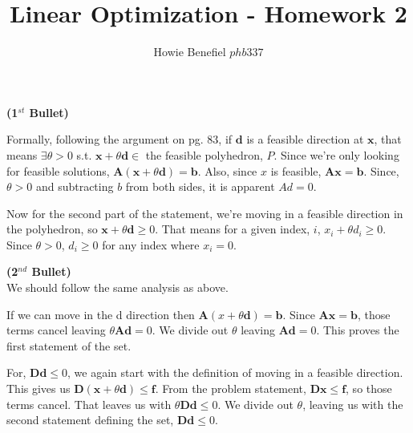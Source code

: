 \documentclass[12pt]{article}
\newcommand{\matr}[1]{\mathbf{#1}}
\newenvironment{problem}[2][Problem]{\begin{trivlist}
\item[\hskip \labelsep {\bfseries #1}\hskip \labelsep {\bfseries #2.}]}{\end{trivlist}}
\newenvironment{subproblem}[1]{\textbf{(#1)}}{}
\theoremstyle{definition}
\begin{document}

\title{Linear Optimization - Homework 2}
\author{Howie Benefiel \(phb337\)}
\maketitle

\begin{problem}{1}
\begin{subproblem}{1$^{st}$ Bullet}
$ $ \newline

Formally, following the argument on pg. 83,
if $\matr{d}$ is a feasible direction at $\matr{x}$, that means $\exists  \theta > 0$ s.t. $\matr{x} + \theta \matr{d} \in$ the feasible polyhedron, $P$.
Since we're only looking for feasible solutions, $\matr{A}(\matr{x} + \theta \matr{d})=\matr{b}$.
Also, since $x$ is feasible, $\matr{A}\matr{x} = \matr{b}$.
Since, $\theta > 0$ and subtracting $b$ from both sides, it is apparent $Ad=0$.

Now for the second part of the statement, we're moving in a feasible direction in the polyhedron,
so $\matr{x}+\theta \matr{d} \geq 0$.
That means for a given index, $i$, $x_i+\theta d_i \geq 0$.
Since $\theta > 0$, $d_i \geq 0$ for any index where $x_i=0$. \\
\end{subproblem}

\begin{subproblem}{2$^{nd}$ Bullet}
$ $ \\
We should follow the same analysis as above.

If we can move in the d direction then $\matr{A}(x + \theta \matr{d}) = \matr{b}$.
Since $\matr{A}\matr{x}=\matr{b}$, those terms cancel leaving $\theta \matr{A} \matr{d} = 0$.
We divide out $\theta$ leaving $\matr{A}\matr{d}=0$.
This proves the first statement of the set.

For, $\matr{D}\matr{d} \leq 0$, we again start with the definition of moving in a feasible direction.
This gives us $\matr{D}(\matr{x}+\theta\matr{d}) \leq \matr{f}$.
From the problem statement, $\matr{D}\matr{x} \leq \matr{f}$, so those terms cancel.
That leaves us with $\theta\matr{D}\matr{d} \leq 0$.
We divide out $\theta$, leaving us with the second statement defining the set, $\matr{D}\matr{d} \leq 0$.
\end{subproblem}

\end{problem}
\end{document}
